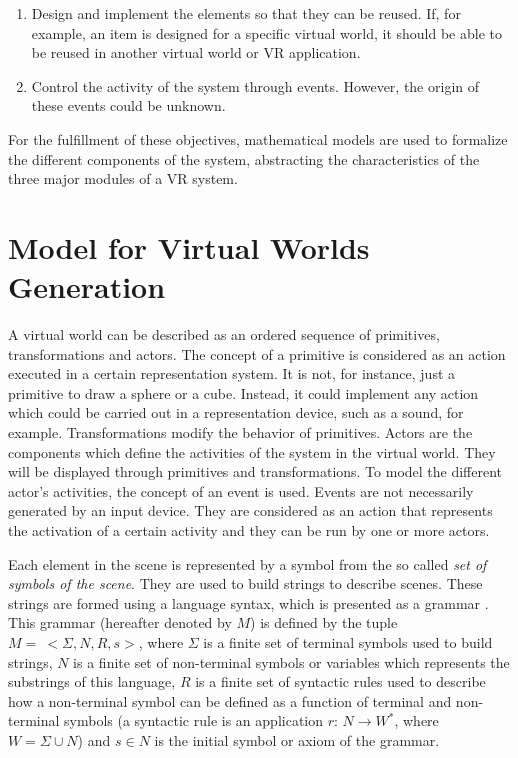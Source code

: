 \documentclass[12pt]{article}
\begin{document}
\begin{enumerate}
    \item Design and implement the elements so that they can be reused. If, for
example, an item is designed for a specific virtual world, it should be able to
be reused in another virtual world or VR application.

    \item Control the activity of the system through events. However, the origin of these events could be unknown.

\end{enumerate}


For the fulfillment of these objectives, mathematical models are used to formalize the different
components of the system, abstracting the characteristics of the three major modules of a VR
system.




\section{Model for Virtual Worlds Generation
\label{sec:model}}

A virtual world can be described as an ordered sequence of primitives, transformations and actors.
The concept of a primitive is considered as an action executed in a certain representation system.
It is not, for instance, just a primitive to draw a sphere or a cube. Instead, it could implement
any action which could be carried out in a representation device, such as a sound, for example.
Transformations modify the behavior of primitives. Actors are the components which define the
activities of the system in the virtual world. They will be displayed through primitives and
transformations. To model the different actor's activities, the concept of an event is used. Events
are not necessarily generated by an input device. They are considered as an action that represents
the activation of a certain activity and they can be run by one or more actors.

Each element in the scene is represented by a symbol from the so called \textit{set of symbols of
the scene}. They are used to build strings to describe scenes. These strings are formed using a
language syntax, which is presented as a grammar \cite{Davis1994}. This grammar (hereafter denoted
by $M$) is defined by the tuple $M= \ <\Sigma, N, R, s>$, where $\Sigma$ is a finite set of
terminal symbols used to build strings, $N$ is a finite set of non-terminal symbols or variables
which represents the substrings of this language, $R$ is a finite set of syntactic rules used to
describe how a non-terminal symbol can be defined as a function of terminal and non-terminal
symbols (a syntactic rule is an application $r$: $N \rightarrow W^*$, where $W = \Sigma \cup N$)
and $s \in N$ is the initial symbol or axiom of the grammar.
\end{document}

